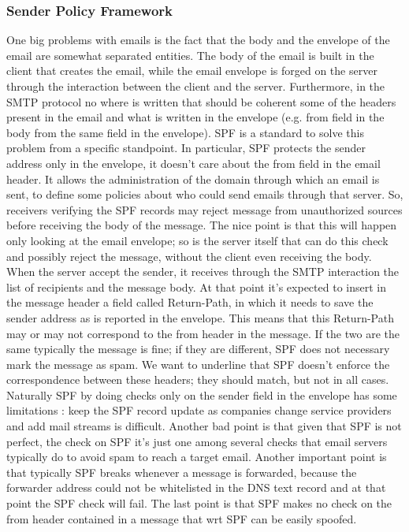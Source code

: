 \subsubsection{Sender Policy Framework}
One big problems with emails is the fact that the body and the envelope of the email are somewhat separated entities. The body of the email is built in the client that creates the email, while the email envelope is forged on the server through the interaction between the client and the server. Furthermore, in the SMTP protocol no where is written that should be coherent some of the headers present in the email and what is written in the envelope (e.g. from field in the body from the same field in the envelope). SPF is a standard to solve this problem from a specific standpoint. In particular, SPF protects the sender address only in the envelope, it doesn't care about the from field in the email header. It allows the administration of the domain through which an email is sent, to define some policies about who could send emails through that server. So, receivers verifying the SPF records may reject message from unauthorized sources before receiving the body of the message. The nice point is that this will happen only looking at the email envelope; so is the server itself that can do this check and possibly reject the message, without the client even receiving the body. When the server accept the sender, it receives through the SMTP interaction the list of recipients and the message body. At that point it's expected to insert in the message header a field called Return-Path, in which it needs to save the sender address as is reported in the envelope. This means that this Return-Path may or may not correspond to the from header in the message. If the two are the same typically the message is fine; if they are different, SPF does not necessary mark the message as spam. We want to underline that SPF doesn't enforce the correspondence between these headers; they should match, but not in all cases. Naturally SPF by doing checks only on the sender field in the envelope has some limitations : keep the SPF record update as companies change service providers and add mail streams is difficult. Another bad point is that given that SPF is not perfect, the check on SPF it's just one among several checks that email servers typically do to avoid spam to reach a target email. Another important point is that typically SPF breaks whenever a message is forwarded, because the forwarder address could not be whitelisted in the DNS text record and at that point the SPF check will fail. The last point is that SPF makes no check on the from header contained in a message that wrt SPF can be easily spoofed.

